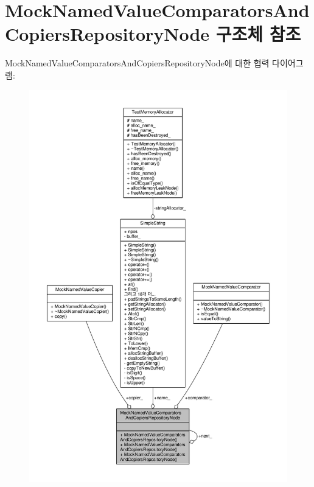 \hypertarget{struct_mock_named_value_comparators_and_copiers_repository_node}{}\section{Mock\+Named\+Value\+Comparators\+And\+Copiers\+Repository\+Node 구조체 참조}
\label{struct_mock_named_value_comparators_and_copiers_repository_node}


Mock\+Named\+Value\+Comparators\+And\+Copiers\+Repository\+Node에 대한 협력 다이어그램\+:
\nopagebreak
\begin{figure}[H]
\begin{center}
\leavevmode
\includegraphics[width=350pt]{struct_mock_named_value_comparators_and_copiers_repository_node__coll__graph}
\end{center}
\end{figure}
